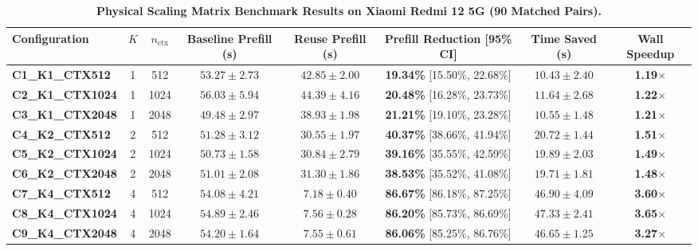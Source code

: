 \begin{table}[t]
\centering
\caption{\textbf{Physical Scaling Matrix Benchmark Results on Xiaomi Redmi 12 5G (90 Matched Pairs).}}
\label{tab:scaling_matrix}
\small
\begin{tabular}{lccccccc}
\toprule
\textbf{Configuration} & $K$ & $n_{\text{ctx}}$ & \textbf{Baseline Prefill (s)} & \textbf{Reuse Prefill (s)} & \textbf{Prefill Reduction [95\% CI]} & \textbf{Time Saved (s)} & \textbf{Wall Speedup} \\
\midrule
\textbf{C1\_K1\_CTX512} & 1 & 512 & $53.27 \pm 2.73$ & $42.85 \pm 2.00$ & \textbf{19.34\%} [15.50\%, 22.68\%] & $10.43 \pm 2.40$ & \textbf{1.19$\times$} \\
\textbf{C2\_K1\_CTX1024} & 1 & 1024 & $56.03 \pm 5.94$ & $44.39 \pm 4.16$ & \textbf{20.48\%} [16.28\%, 23.73\%] & $11.64 \pm 2.68$ & \textbf{1.22$\times$} \\
\textbf{C3\_K1\_CTX2048} & 1 & 2048 & $49.48 \pm 2.97$ & $38.93 \pm 1.98$ & \textbf{21.21\%} [19.10\%, 23.28\%] & $10.55 \pm 1.48$ & \textbf{1.21$\times$} \\
\midrule
\textbf{C4\_K2\_CTX512} & 2 & 512 & $51.28 \pm 3.12$ & $30.55 \pm 1.97$ & \textbf{40.37\%} [38.66\%, 41.94\%] & $20.72 \pm 1.44$ & \textbf{1.51$\times$} \\
\textbf{C5\_K2\_CTX1024} & 2 & 1024 & $50.73 \pm 1.58$ & $30.84 \pm 2.79$ & \textbf{39.16\%} [35.55\%, 42.59\%] & $19.89 \pm 2.03$ & \textbf{1.49$\times$} \\
\textbf{C6\_K2\_CTX2048} & 2 & 2048 & $51.01 \pm 2.08$ & $31.30 \pm 1.86$ & \textbf{38.53\%} [35.52\%, 41.08\%] & $19.71 \pm 1.81$ & \textbf{1.48$\times$} \\
\midrule
\textbf{C7\_K4\_CTX512} & 4 & 512 & $54.08 \pm 4.21$ & $7.18 \pm 0.40$ & \textbf{86.67\%} [86.18\%, 87.25\%] & $46.90 \pm 4.09$ & \textbf{3.60$\times$} \\
\textbf{C8\_K4\_CTX1024} & 4 & 1024 & $54.89 \pm 2.46$ & $7.56 \pm 0.28$ & \textbf{86.20\%} [85.73\%, 86.69\%] & $47.33 \pm 2.41$ & \textbf{3.65$\times$} \\
\textbf{C9\_K4\_CTX2048} & 4 & 2048 & $54.20 \pm 1.64$ & $7.55 \pm 0.61$ & \textbf{86.06\%} [85.25\%, 86.76\%] & $46.65 \pm 1.25$ & \textbf{3.27$\times$} \\
\bottomrule
\end{tabular}
\end{table}


